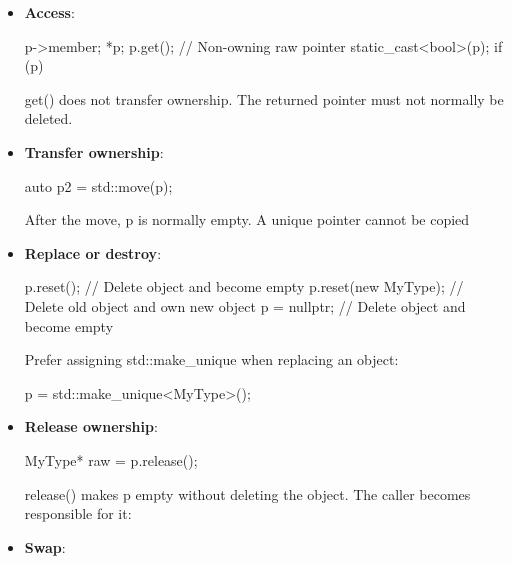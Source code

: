 \documentclass{report}
\begin{document}
\begin{itemize}
\begin{itemize}
                    \bigbreak \noindent 
                    Prefer std::make\_unique over writing new directly.
                \item \textbf{Access}:
                    \bigbreak \noindent 
                    \begin{cppcode}
                        p->member;
                        *p;
                        p.get();             // Non-owning raw pointer
                        static_cast<bool>(p);
                        if (p) { }
                    \end{cppcode}
                    \bigbreak \noindent 
                    get() does not transfer ownership. The returned pointer must not normally be deleted.
                \item \textbf{Transfer ownership}:
                    \bigbreak \noindent 
                    \begin{cppcode}
                    auto p2 = std::move(p);
                    \end{cppcode}
                    \bigbreak \noindent 
                    After the move, p is normally empty. A unique pointer cannot be copied
                \item \textbf{Replace or destroy}:
                    \bigbreak \noindent 
                    \begin{cppcode}
                        p.reset();            // Delete object and become empty
                        p.reset(new MyType);  // Delete old object and own new object
                        p = nullptr;          // Delete object and become empty
                    \end{cppcode}
                    \bigbreak \noindent 
                    Prefer assigning std::make\_unique when replacing an object:
                    \bigbreak \noindent 
                    \begin{cppcode}
                    p = std::make_unique<MyType>();
                    \end{cppcode}
                \item \textbf{Release ownership}:
                    \bigbreak \noindent 
                    \begin{cppcode}
                    MyType* raw = p.release();
                    \end{cppcode}
                    \bigbreak \noindent 
                    release() makes p empty without deleting the object. The caller becomes responsible for it:
                \item \textbf{Swap}:

\end{itemize}
\end{itemize}
\end{document}
